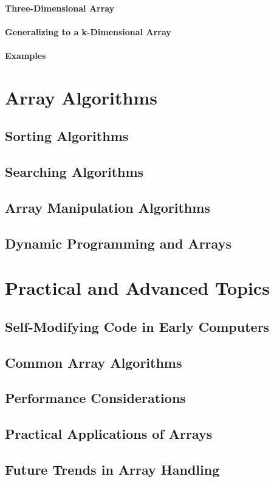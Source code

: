 \documentclass[12pt, oneside]{book}
\begin{document}
\subsubsection{Three-Dimensional Array}
\subsubsection{Generalizing to a k-Dimensional Array}
\subsubsection{Examples}
\chapter{Array Algorithms}
\section{Sorting Algorithms}
\section{Searching Algorithms}
\section{Array Manipulation Algorithms}
\section{Dynamic Programming and Arrays}
\chapter{Practical and Advanced Topics}
\section{Self-Modifying Code in Early Computers}
\section{Common Array Algorithms}
\section{Performance Considerations}
\section{Practical Applications of Arrays}
\section{Future Trends in Array Handling}
\end{document}
